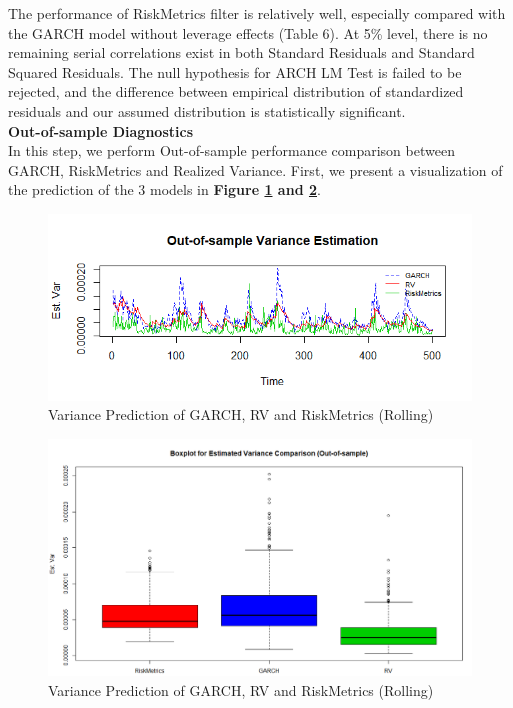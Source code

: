 \documentclass[a4paper]{article}
\begin{document}


The performance of RiskMetrics filter is relatively well, especially compared with the GARCH model without leverage effects (Table 6). At 5\% level, there is no remaining serial correlations exist in both Standard Residuals and Standard Squared Residuals. The null hypothesis for ARCH LM Test is failed to be rejected, and the difference between empirical distribution of standardized residuals and our assumed distribution is statistically significant.\\

\textbf{Out-of-sample Diagnostics}\\

In this step, we perform Out-of-sample performance comparison between GARCH, RiskMetrics and Realized Variance. First, we present a visualization of the prediction of the 3 models in \textbf{Figure \ref{fig:oos_plot} and \ref{fig:boxplot}}.

\begin{figure}[H]
\centering
\includegraphics[width=1.05\textwidth]{Rplot01.png}
\caption{\label{fig:oos_plot}Variance Prediction of GARCH, RV and RiskMetrics (Rolling)}
\end{figure}

\begin{figure}[H]
\centering
\includegraphics[width=1.03\textwidth]{Rplot02.png}
\caption{\label{fig:boxplot}Variance Prediction of GARCH, RV and RiskMetrics (Rolling)}
\end{figure}
\end{document}
